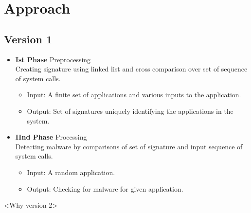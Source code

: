 \section{Approach}
\subsection{Version 1}
    \begin{itemize}
        \item[] \textbf{Ist Phase} Preprocessing \\ Creating signature using linked list and cross comparison over set of sequence of system calls.
            \begin{itemize}
                \item[] Input: A finite set of applications and various inputs to the application.
                \item[] Output: Set of signatures uniquely identifying the applications in the system.
            \end{itemize}
        \item[] \textbf{IInd Phase} Processing \\ Detecting malware by comparisons of set of signature and input sequence of system calls.
            \begin{itemize}
                \item[] Input: A random application.
                \item[] Output: Checking for malware for given application.
            \end{itemize}
    \end{itemize}

<Why version 2>


